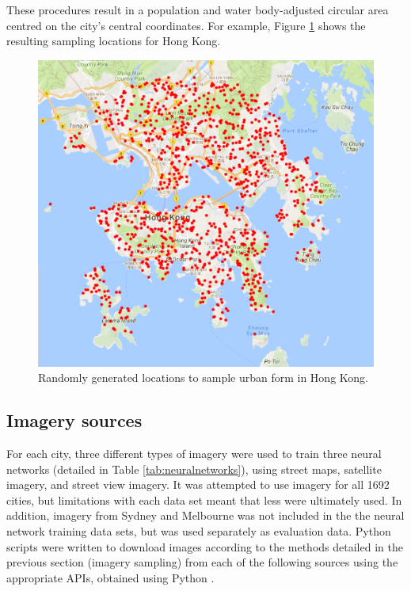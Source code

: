 \documentclass[sageh,times]{sagej}
\begin{document}
These procedures result in a population and water body-adjusted circular area centred on the city's central coordinates. For example, Figure \ref{fig:hongkong}  shows the resulting sampling locations for Hong Kong.



\begin{figure}[!htbp] 
    \centering    
\includegraphics[scale=1]{Images/HongKong.png} 
\caption{Randomly generated locations to sample urban form in Hong Kong.} 
\label{fig:hongkong}  
\end{figure}


\label{methodsimagery}
\subsection{Imagery sources}


For each city, three different types of imagery were used to train three neural networks (detailed in Table \ref{tab:neuralnetworks}), using street maps, satellite imagery, and street view imagery. It was attempted to use imagery for all 1692 cities, but limitations with each data set meant that less were ultimately used. In addition, imagery from Sydney and Melbourne was not included in the the neural network training data sets, but was used separately as evaluation data. Python scripts were written to download images according to the methods detailed in the previous section (imagery sampling) from each of the following sources using the appropriate APIs, obtained using Python \citep{Python2016}.
\end{document}
